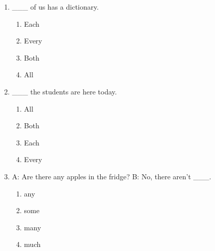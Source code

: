 \documentclass[11pt,a4paper]{ctexart}
\begin{document}
\begin{enumerate}[leftmargin=*,itemsep=4pt]
\begin{enumerate}[label=\Alph*.,leftmargin=2em,itemsep=1pt,topsep=2pt]
\item Either
\item Both
\end{enumerate}
\item \_\_\_ of us has a dictionary.
\begin{enumerate}[label=\Alph*.,leftmargin=2em,itemsep=1pt,topsep=2pt]
\item Each
\item Every
\item Both
\item All
\end{enumerate}
\item \_\_\_ the students are here today.
\begin{enumerate}[label=\Alph*.,leftmargin=2em,itemsep=1pt,topsep=2pt]
\item All
\item Both
\item Each
\item Every
\end{enumerate}
\item A: Are there any apples in the fridge? B: No, there aren’t \_\_\_.
\begin{enumerate}[label=\Alph*.,leftmargin=2em,itemsep=1pt,topsep=2pt]
\item any
\item some
\item many
\item much
\end{enumerate}
\end{enumerate}

\newpage
\end{document}
